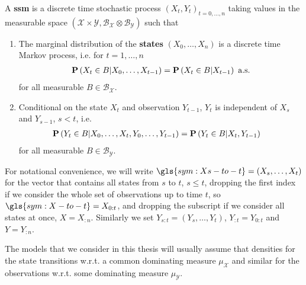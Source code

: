 \begin{definition}
    \label{def:ssm}
    A \textbf{\gls{ssm}} is a discrete time stochastic process $(X_t, Y_t)_{t=0, \dots, n}$ taking values in the measurable space $\left(\mathcal X \times \mathcal Y, \mathcal B_{\mathcal X} \otimes \mathcal B_{\mathcal Y}\right)$ such that
    \begin{enumerate}
        \item The marginal distribution of the \textbf{states} $(X_0, \dots, X_{n})$ is a discrete time Markov process, i.e. for $t = 1, \dots, n$
              \begin{align}
                  \label{eq:markov_property}
                  \P \left( X_{t} \in B \middle| X_0, \dots, X_{t - 1} \right) = \P \left( X_{t} \in B \middle| X_{t - 1} \right) \text{ a.s.}
              \end{align}
              for all measurable $B \in \mathcal B_{\mathcal X}$.
        \item Conditional on the state $X_t$ and observation $Y_{t - 1}$, $Y_t$ is independent of $X_s$ and $Y_{s - 1}$, $s < t$, i.e.
              \begin{align*}
                  \P \left( Y_{t} \in B \middle| X_{0}, \dots, X_{t}, Y_{0}, \dots, Y_{t - 1} \right) & = \P \left( Y_{t} \in B | X_{t}, Y_{t - 1} \right)
              \end{align*}
              for all measurable $B \in \mathcal B _{\mathcal Y}$.
    \end{enumerate}
\end{definition}

For notational convenience, we will write $\gls{sym:Xs-to-t} = \left(X_s, \dots, X_{t}\right)$ for the vector that contains all states from $s$ to $t$, $s \leq t$, dropping the first index if we consider the whole set of observations up to time $t$, so $\gls{sym:X-to-t} = X_{0:t}$, and dropping the subscript if we consider all states at once, $X = X_{:n}$.
Similarly we set $Y_{s:t} = \left(Y_s, \dots, Y_{t}\right)$, $Y_{:t} = Y_{0:t}$ and $Y = Y_{:n}$.


The models that we consider in this thesis will usually assume that densities for the state transitions w.r.t. a common dominating measure $\mu_{\mathcal X}$ and similar for the observations w.r.t. some dominating measure $\mu_{\mathcal Y}$. 

